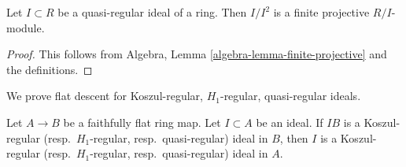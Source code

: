 \begin{lemma}
\label{lemma-quasi-regular-ideal-finite-projective}
Let $I \subset R$ be a quasi-regular ideal of a ring.
Then $I/I^2$ is a finite projective $R/I$-module.
\end{lemma}

\begin{proof}
This follows from Algebra, Lemma \ref{algebra-lemma-finite-projective}
and the definitions.
\end{proof}

\noindent
We prove flat descent for Koszul-regular, $H_1$-regular, quasi-regular
ideals.

\begin{lemma}
\label{lemma-flat-descent-regular-ideal}
Let $A \to B$ be a faithfully flat ring map. Let $I \subset A$ be an ideal.
If $IB$ is a Koszul-regular
(resp.\ $H_1$-regular, resp.\ quasi-regular) ideal in $B$, then
$I$ is a Koszul-regular (resp.\ $H_1$-regular, resp.\ quasi-regular)
ideal in $A$.
\end{lemma}

